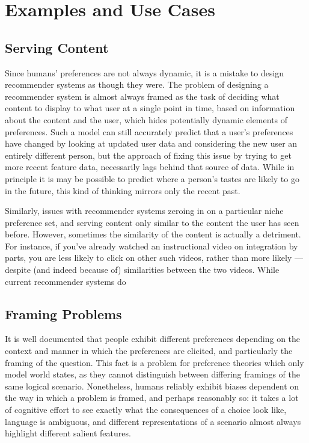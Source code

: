 \documentclass{article}
\begin{document}
	
	\section{Examples and Use Cases}
	
	\subsection{Serving Content}
	Since humans' preferences are not always dynamic, it is a mistake to design recommender systems as though they were. The problem of designing a recommender system is almost always framed as the task of deciding what content to display to what user at a single point in time, based on information about the content and the user, which hides potentially dynamic elements of preferences. Such a model can still accurately predict that a user's preferences have changed by looking at updated user data and considering the new user an entirely different person, but the approach of fixing this issue by trying to get more recent feature data, necessarily lags behind that source of data. While in principle it is may be possible to predict where a person's tastes are likely to go in the future, this kind of thinking mirrors only the recent past.
	
	Similarly, issues with recommender systems zeroing in on a particular niche preference set, and serving content only similar to the content the user has seen before. However, sometimes the similarity of the content is actually a detriment. For instance, if you've already watched an instructional video on integration by parts, you are less likely to click on other such videos, rather than more likely --- despite (and indeed because of) similarities between the two videos. While current recommender systems do 
	
	\subsection{Framing Problems}
	It is well documented that people exhibit different preferences depending on the context and manner in which the preferences are elicited, and particularly the framing of the question. This fact is a problem for preference theories which only model world states, as they cannot distinguish between differing framings of the same logical scenario. Nonetheless, humans reliably exhibit biases dependent on the way in which a problem is framed, and perhaps reasonably so: it takes a lot of cognitive effort to see exactly what the consequences of a choice look like, language is ambiguous, and different representations of a scenario almost always highlight different salient features.
	
\end{document}
